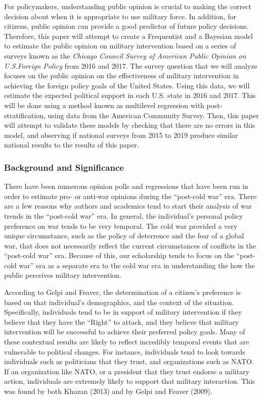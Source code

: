 \documentclass[
  11pt,
]{article}
\begin{document}
For policymakers, understanding public opinion is crucial to making the
correct decision about when it is appropriate to use military force. In
addition, for citizens, public opinion can provide a good predictor of
future policy decisions. Therefore, this paper will attempt to create a
Frequentist and a Bayesian model to estimate the public opinion on
military intervention based on a series of surveys known as the
\emph{Chicago Council Survey of American Public Opinion on U.S.Foreign
Policy} from 2016 and 2017. The survey question that we will analyze
focuses on the public opinion on the effectiveness of military
intervention in achieving the foreign policy goals of the United States.
Using this data, we will estimate the expected political support in each
U.S. state in 2016 and 2017. This will be done using a method known as
multilevel regression with post-stratification, using data from the
American Community Survey. Then, this paper will attempt to validate
these models by checking that there are no errors in this model, and
observing if national surveys from 2015 to 2019 produce similar national
results to the results of this paper.

\hypertarget{background-and-significance}{%
\subsubsection{Background and
Significance}\label{background-and-significance}}

There have been numerous opinion polls and regressions that have been
run in order to estimate pro- or anti-war opinions during the
``post-cold war'' era. There are a few reasons why authors and academics
tend to start their analysis of war trends in the ``post-cold war'' era.
In general, the individual's personal policy preference on war tends to
be very temporal. The cold war provided a very unique circumstance, such
as the policy of deterrence and the fear of a global war, that does not
necessarily reflect the current circumstances of conflicts in the
``post-cold war'' era. Because of this, our scholarship tends to focus
on the ``post-cold war'' era as a separate era to the cold war era in
understanding the how the public perceives military intervention.

According to Gelpi and Feaver, the determination of a citizen's
preference is based on that individual's demographics, and the context
of the situation. Specifically, individuals tend to be in support of
military intervention if they believe that they have the ``Right'' to
attack, and they believe that military intervention will be successful
to achieve their preferred policy goals. Many of these contextual
results are likely to reflect incredibly temporal events that are
vulnerable to political changes. For instance, individuals tend to look
towards individuals such as politicians that they trust, and
organizations such as NATO. If an organization like NATO, or a president
that they trust endorse a military action, individuals are extremely
likely to support that military interaction. This was found by both
Khazan (2013) and by Gelpi and Feaver (2009).
\end{document}
